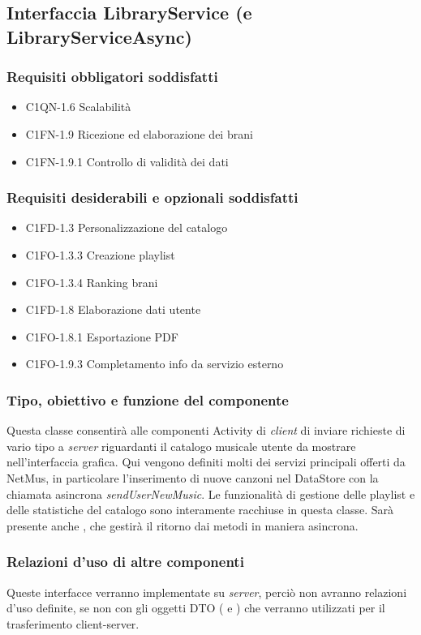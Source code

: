 \subsection{Interfaccia LibraryService (e LibraryServiceAsync)}
\subsubsection*{Requisiti obbligatori soddisfatti}
\begin{itemize}
    \item C1QN-1.6 Scalabilit\`a
    \item C1FN-1.9 Ricezione ed elaborazione dei brani
    \item C1FN-1.9.1 Controllo di validit\`a dei dati
\end{itemize}
\subsubsection*{Requisiti desiderabili e opzionali soddisfatti}
\begin{itemize}
    \item C1FD-1.3 Personalizzazione del catalogo
    \item C1FO-1.3.3 Creazione playlist
    \item C1FO-1.3.4 Ranking brani
    \item C1FD-1.8 Elaborazione dati utente
    \item C1FO-1.8.1 Esportazione PDF
    \item C1FO-1.9.3 Completamento info da servizio esterno
\end{itemize}
\subsubsection*{Tipo, obiettivo e funzione del componente}
Questa classe consentir\`a alle componenti Activity di \emph{client} di inviare
richieste di vario tipo a \emph{server} riguardanti il catalogo musicale utente
da mostrare nell'interfaccia grafica. Qui vengono definiti molti dei servizi
principali offerti da NetMus, in particolare l'inserimento di nuove canzoni nel
DataStore con la chiamata asincrona \emph{sendUserNewMusic}. Le
funzionalit\`a di gestione delle playlist e delle statistiche del
catalogo sono interamente racchiuse in questa classe. Sar\`a presente anche
, che gestir\`a il ritorno dai metodi in maniera asincrona. 
\subsubsection*{Relazioni d'uso di altre componenti}
Queste interfacce verranno implementate su \emph{server}, perci\`o non
avranno relazioni d'uso definite, se non con gli oggetti DTO
( e ) che verranno utilizzati per
il trasferimento client-server.
